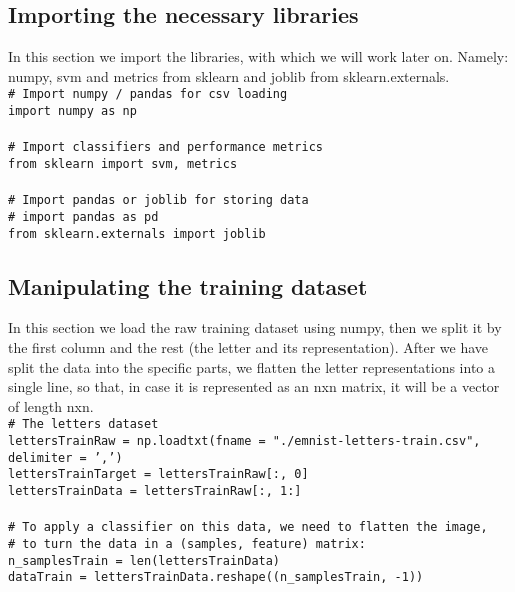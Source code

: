 \documentclass[a4paper,10pt]{report}
\newcommand{\code}[1]{\colorbox{light-gray}{\texttt{#1}}}
\begin{document}
 \subsection{Importing the necessary libraries}
 In this section we import the libraries, with which we will work later on. Namely: numpy, svm and metrics from sklearn and joblib from sklearn.externals.\\
 \code{\# Import numpy / pandas for csv loading}\\
 \code{import numpy as np}\\
 \code{}\\
 \code{\# Import classifiers and performance metrics}\\
 \code{from sklearn import svm, metrics}\\
 \code{}\\
 \code{\# Import pandas or joblib for storing data}\\
 \code{\# import pandas as pd}\\
 \code{from sklearn.externals import joblib}\\

 \subsection{Manipulating the training dataset} 
 In this section we load the raw training dataset using numpy, then we split it by the first column and the rest (the letter and its representation). After we have split the data into the specific parts, we flatten the letter representations into a single line, so that, in case it is represented as an nxn matrix, it will be a vector of length nxn.\\
 \code{\# The letters dataset}\\
 \code{lettersTrainRaw = np.loadtxt(fname = "./emnist-letters-train.csv", delimiter = ',')}\\
 \code{lettersTrainTarget = lettersTrainRaw[:, 0]}\\
 \code{lettersTrainData = lettersTrainRaw[:, 1:]}\\
 \code{}\\
 \code{\# To apply a classifier on this data, we need to flatten the image,}\\
 \code{\# to turn the data in a (samples, feature) matrix:}\\
 \code{n\_samplesTrain = len(lettersTrainData)}\\
 \code{dataTrain = lettersTrainData.reshape((n\_samplesTrain, -1))}\\
\end{document}

